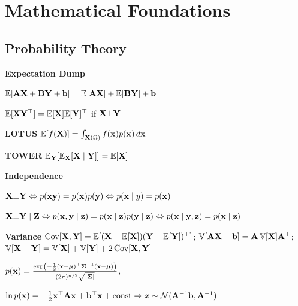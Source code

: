 \section{Mathematical Foundations}
\subsection{Probability Theory}

\begin{colored}
    \textbf{Expectation Dump}

    \begin{itemize*}
        \item \(\mathbb{E}[\vb{A}\vb{X} + \vb{B}\vb{Y} + \vb{b}] = \mathbb{E}[\vb{A}\vb{X}] + \mathbb{E}[\vb{B}\vb{Y}] + \vb{b}\)
        \item \(\mathbb{E}[\vb{X}\vb{Y}^\top] = \mathbb{E}[\vb{X}] \mathbb{E}[\vb{Y}]^\top\) if \(\vb{X} \bot \vb{Y}\)
        \item \textbf{LOTUS} \(\mathbb{E}[f(\vb{X})] = \int_{\vb{X}(\Omega)} f(\vb{x})p(\vb{x})\,d\vb{x}\)
        \item \textbf{TOWER} \(\mathbb{E}_{\vb{Y}} [\mathbb{E}_{\vb{X}}[\vb{X} \mid \vb{Y}]] = \mathbb{E}[\vb{X}]\)
    \end{itemize*}
\end{colored}

\begin{colored}
    \textbf{Independence}
    \begin{itemize*}
    \item \(\vb{X}\bot\vb{Y} \Leftrightarrow p(\vb{x}\vb{y}) = p(\vb{x})p(\vb{y}) \Leftrightarrow p(\vb{x} \mid y) = p(\vb{x}) \)

    \item \(\vb{X}\bot\vb{Y}\mid\vb{Z} \Leftrightarrow p(\vb{x}, \vb{y} \mid \vb{z}) = p(\vb{x}\mid\vb{z}) p(\vb{y} \mid \vb{z})
    \Leftrightarrow p(\vb{x} \mid \vb{y}, \vb{z}) = p(\vb{x} \mid \vb{z})\)
    \end{itemize*}
    
\end{colored}

\begin{colored}
    \textbf{Variance}
    \(\operatorname{Cov}[\vb{X}, \vb{Y}] = \mathbb{E}[(\vb{X} - \mathbb{E}[\vb{X}])(\vb{Y} - \mathbb{E}[\vb{Y}])^\top]\);
    \(\operatorname{\mathbb{V}}[\vb{A}\vb{X} + \vb{b}] = \vb{A}\operatorname{\mathbb{V}}[\vb{X}]\vb{A}^\top\);
    \(\operatorname{\mathbb{V}}[\vb{X} + \vb{Y}] = \operatorname{\mathbb{V}}[\vb{X}] + \operatorname{\mathbb{V}}[\vb{Y}] + 2 \operatorname{Cov}[\vb{X}, \vb{Y}]\)
\end{colored}

\begin{definition}[Gauss]
    \(p(\vb{x}) = \frac{\exp\left(-\frac{1}{2}(\vb{x} - \vb*{\mu})^\top \vb*{\Sigma}^{-1}(\vb{x} - \vb*{\mu})\right)}{(2 \pi)^{n/2} \sqrt{\vert\vb*{\Sigma}\vert}}\), 
\end{definition}

\begin{lemma}
    \(\ln p(\vb{x}) = -\frac{1}{2}\vb{x}^\top \mathbf{A} \vb{x} + \mathbf{b}^\top \vb{x} + \text{const} \Rightarrow x \sim \operatorname{\mathcal{N}}(\vb{A}^{-1}\vb{b}, \vb{A}^{-1})\)
\end{lemma}

